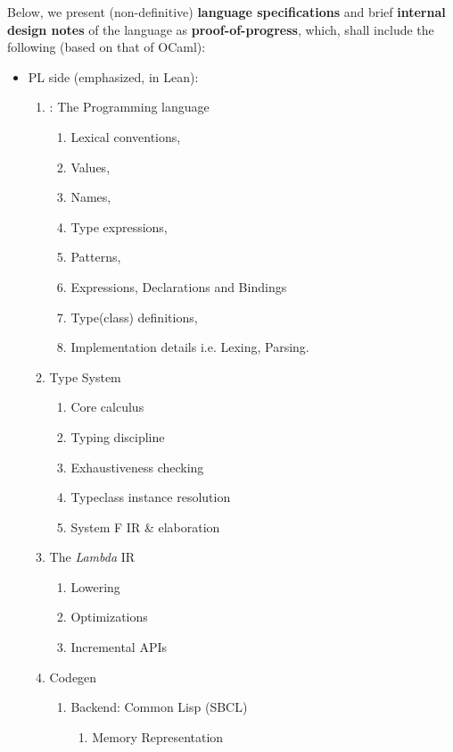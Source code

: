 \documentclass[a4paper, 11pt]{article}
\theoremstyle{remark}\newtheorem*{remark}{Remark}
\theoremstyle{definition}\newtheorem*{definition}{Definition}
\begin{document}
Below, we present (non-definitive) \textbf{language specifications} and brief \textbf{internal design notes}
of the language as \textbf{proof-of-progress}, which, shall include the following
(based on that of OCaml):
\begin{itemize}
  \item PL side (emphasized, in Lean):
    \begin{enumerate}
      \item \Tigris: The Programming language
        \begin{enumerate}
          \item Lexical conventions,
          \item Values,
          \item Names,
          \item Type expressions,
          \item Patterns,
          \item Expressions, Declarations and Bindings
          \item Type(class) definitions,
          \item Implementation details i.e. Lexing, Parsing.
        \end{enumerate}
      \item Type System
        \begin{enumerate}
          \item Core calculus
          \item Typing discipline
          \item Exhaustiveness checking
          \item Typeclass instance resolution
          \item System F IR \& elaboration
        \end{enumerate}
      \item The \emph{Lambda} IR
        \begin{enumerate}
          \item Lowering
          \item Optimizations
          \item Incremental APIs
        \end{enumerate}
      \item Codegen
        \begin{enumerate}
          \item Backend: Common Lisp (SBCL)
            \begin{enumerate}
              \item Memory Representation

\end{enumerate}
\end{enumerate}
\end{enumerate}
\end{itemize}
\end{document}
